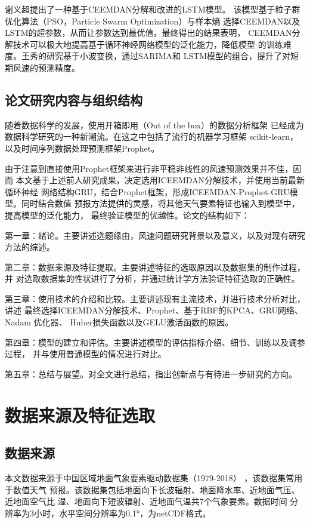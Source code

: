 \documentclass[AutoFakeBold]{LZUThesis}
\begin{document}
谢义超\cite{谢义超2021基于}提出了一种基于CEEMDAN分解和改进的LSTM模型。
该模型基于粒子群优化算法（PSO，Particle Swarm Optimization）与样本熵
选择CEEMDAN以及LSTM的超参数，从而让参数达到最优值。最终得出的结果表明，
CEEMDAN分解技术可以极大地提高基于循环神经网络模型的泛化能力，降低模型
的训练难度。王秀的研究\cite{王秀2021基于}基于小波变换，通过SARIMA和
LSTM模型的组合，提升了对短期风速的预测精度。

\section{论文研究内容与组织结构}

随着数据科学的发展，使用开箱即用（Out of the box）的数据分析框架
已经成为数据科学研究的一种新潮流。在这之中包括了流行的机器学习框架
scikit-learn，以及时间序列数据处理预测框架Prophet。

由于注意到直接使用Prophet框架来进行非平稳非线性的风速预测效果并不佳，因而
本文基于上述前人研究成果，决定选用ICEEMDAN分解技术，并使用当前最新循环神经
网络结构GRU，结合Prophet框架，形成ICEEMDAN-Prophet-GRU模型。同时结合数值
预报方法提供的灵感，将其他天气要素特征也输入到模型中，提高模型的泛化能力，
最终验证模型的优越性。论文的结构如下：

第一章：绪论。主要讲述选题缘由，风速问题研究背景以及意义，以及对现有研究
方法的综述。

第二章：数据来源及特征提取。主要讲述特征的选取原因以及数据集的制作过程，并
对选取数据集的性状进行了分析，并通过统计学方法验证特征选取的正确性。

第三章：使用技术的介绍和比较。主要讲述现有主流技术，并进行技术分析对比，讲述
最终选择ICEEMDAN分解技术、Prophet、基于RBF的KPCA、GRU网络、Nadam 优化器、
Huber损失函数以及GELU激活函数的原因。

第四章：模型的建立和评估。主要讲述模型的评估指标介绍、细节、训练以及调参过程，
并与使用普通模型的情况进行对比。

第五章：总结与展望。对全文进行总结，指出创新点与有待进一步研究的方向。




\chapter{数据来源及特征选取}
\section{数据来源}
本文数据来源于中国区域地面气象要素驱动数据集（1979-2018）
\cite{8028b944-daaa-4511-8769-965612652c49}，该数据集常用于数值天气
预报。该数据集包括地面向下长波辐射、地面降水率、近地面气压、近地面空气比
湿、地面向下短波辐射、近地面气温共7个气象要素。数据时间
分辨率为3小时，水平空间分辨率为0.1°，为netCDF格式。
\cite{37cab0ac-d066-4fb9-aa9c-1cf50d601096}
\end{document}
